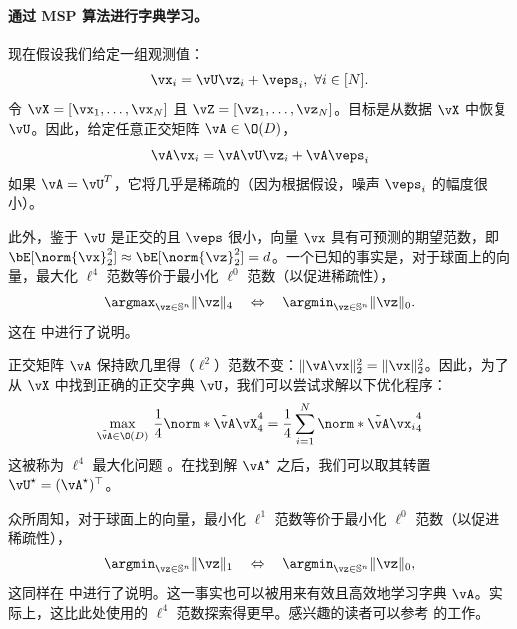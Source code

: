 \documentclass[../../book-main_zh.tex]{subfiles}
\begin{document}
\paragraph{通过 MSP 算法进行字典学习。}

现在假设我们给定一组观测值：
\begin{equation}
    \vx_i = \vU \vz_i + \veps_i,\ \forall i \in [N].
\end{equation}
令 $\vX = [\vx_1, \dots, \vx_N]$ 且 $\vZ = [\vz_1, \dots,
\vz_N]$。目标是从数据 $\vX$ 中恢复 $\vU$。因此，给定任意正交矩阵 $\vA \in \O(D)$，
\begin{equation}
    \vA\vx_i = \vA\vU \vz_i + \vA\veps_i
\end{equation}
如果 $\vA = \vU^T$，它将几乎是稀疏的（因为根据假设，噪声 $\veps_i$ 的幅度很小）。

此外，鉴于 $\vU$ 是正交的且 $\veps$ 很小，向量 $\vx$ 具有可预测的期望范数，即
$\bE[\norm{\vx}_2^2] \approx
\bE[\norm{\vz}_2^2]=d$。一个已知的事实是，对于球面上的向量，最大化 $\ell^4$ 范数等价于最小化
$\ell^0$ 范数（以促进稀疏性），
\begin{equation}
    \argmax_{\vz \in
    \mathbb{S}^n}\|\vz\|_{4}\quad\Leftrightarrow\quad \argmin_{\vz
    \in \mathbb{S}^n}\|\vz\|_{0}.
\end{equation}
这在  中进行了说明。

正交矩阵 $\vA$ 保持欧几里得（\(\ell^{2}\)）范数不变：$\|\vA \vx\|_2^2 =
\|\vx\|_2^2$。因此，为了从 $\vX$ 中找到正确的正交字典 $\vU$，我们可以尝试求解以下优化程序：
\begin{equation}\label{eq0:orthogonal-dictionary-learning-l4}
    \max_{\tilde{\vA} \in \O(D)}\,
    \frac{1}{4} \norm*{
        \tilde{\vA} \vX
    }_4^4 =  \frac{1}{4} \sum_{i=1}^N \norm*{
        \tilde{\vA} \vx_i
    }_4^4
\end{equation}
这被称为 $\ell^4$ 最大化问题 \cite{Zhai-2020}。在找到解 \(\vA^{\star}\) 之后，我们可以取其转置
\(\vU^{\star}
= (\vA^{\star})^{\top}\)。
\begin{remark}
    众所周知，对于球面上的向量，最小化 $\ell^1$ 范数等价于最小化 $\ell^0$ 范数（以促进稀疏性），
    \begin{equation*}
        \argmin_{\vz \in
        \mathbb{S}^n}\|\vz\|_{1}\quad\Leftrightarrow\quad
        \argmin_{\vz \in \mathbb{S}^n}\|\vz\|_{0},
    \end{equation*}
    这同样在  中进行了说明。这一事实也可以被用来有效且高效地学习字典
    $\vA$。实际上，这比此处使用的 $\ell^4$ 范数探索得更早。感兴趣的读者可以参考
    \cite{qu2020findingsparsestvectorssubspace} 的工作。
\end{remark}
\end{document}
